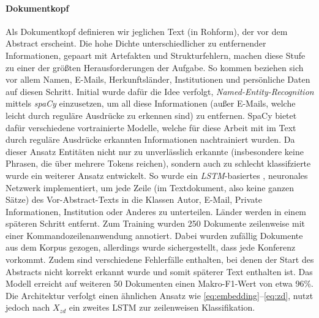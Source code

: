 \documentclass[bachelor,german]{info1thesis}
\begin{document}
\paragraph{Dokumentkopf} Als Dokumentkopf definieren wir jeglichen Text (in Rohform), der vor dem Abstract erscheint. Die hohe Dichte unterschiedlicher zu entfernender Informationen, gepaart mit Artefakten und Strukturfehlern, machen diese Stufe zu einer der größten Herausforderungen der Aufgabe. So kommen beziehen sich vor allem Namen, E-Mails, Herkunftsländer, Institutionen und persönliche Daten auf diesen Schritt. Initial wurde dafür die Idee verfolgt, \textit{Named-Entity-Recognition} mittels \textit{spaCy} \cite{Honnibal2017} einzusetzen, um all diese Informationen (außer E-Mails, welche leicht durch reguläre Ausdrücke zu erkennen sind) zu entfernen. SpaCy bietet dafür verschiedene vortrainierte Modelle, welche für diese Arbeit mit im Text durch reguläre Ausdrücke erkannten Informationen nachtrainiert wurden. Da dieser Ansatz Entitäten nicht nur zu unverlässlich erkannte (insbesondere keine Phrasen, die über mehrere Tokens reichen), sondern auch zu schlecht klassifzierte wurde ein weiterer Ansatz entwickelt. So wurde ein \textit{LSTM}-basiertes \cite{Hochreiter1997}, neuronales Netzwerk implementiert, um jede Zeile (im Textdokument, also keine ganzen Sätze) des Vor-Abstract-Texts in die Klassen Autor, E-Mail, Private Informationen, Institution oder Anderes zu unterteilen. Länder werden in einem späteren Schritt entfernt.  Zum Training wurden 250 Dokumente zeilenweise mit einer Kommandozeilenanwendung annotiert. Dabei wurden zufällig Dokumente aus dem Korpus gezogen, allerdings wurde sichergestellt, dass jede Konferenz vorkommt. Zudem sind verschiedene Fehlerfälle enthalten, bei denen der Start des Abstracts nicht korrekt erkannt wurde und somit späterer Text enthalten ist. Das Modell erreicht auf weiteren 50 Dokumenten einen Makro-F1-Wert von etwa 96\%. Die Architektur verfolgt einen ähnlichen Ansatz wie \autoref{eq:embedding}--\ref{eq:zd}, nutzt jedoch nach $X_{zd}$ ein zweites LSTM zur zeilenweisen Klassifikation.
\end{document}
